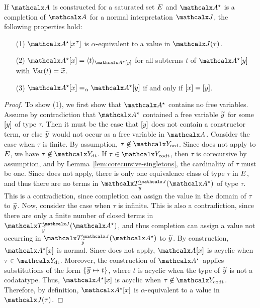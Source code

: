 \begin{lemma}
\label{lem:interpretation-completion}
If $\Val$ is constructed for a saturated set $E$
and $\ValC$ is a completion of $\Val$ for a normal interpretation $\J$, the following properties hold:
\begin{enumerate}
\item[\rm (1)] $\ValC \ec{x\typ{\tau}}$ is $\alpha$-equivalent to a value in $\interp{\J}{\tau}$.
\item[\rm (2)]
$\ValC \ec{x} = \expand{\ValC \ec{y}}{ t }$ for
all subterms $t$ of $\ValC \ec{y}$ with $\muvar(t) = {\Varec{x}}$.
\item[\rm (3)]
$\ValC \ec{x} \vsim \ValC \ec{y}$ if and only if $[x] = [y]$.
\end{enumerate}
\end{lemma}
\begin{rep}
\begin{proof}
To show (1), we first show that $\ValC$ contains no free variables.
Assume by contradiction that $\ValC$ contained a free variable ${\Varec{y}}$ for some $[y]$ of type $\tau$.
Then it must be the case that $[y]$ does not contain a constructor term,
or else ${\Varec{y}}$ would not occur as a free variable in $\Val$.
Consider the case when $\tau$ is finite.
By assumption, $\tau \not\in \Nondata$.
Since  does not apply to $E$, we have $\tau \not\in \Data$.
If $\tau \in \Codata$, then $\tau$ is corecursive by assumption, and by Lemma~\ref{lem:corecursive-singletons},
the cardinality of $\tau$ must be one.
Since  does not apply, %
there is only one equivalence class of type $\tau$ in $E$,
and thus there are no terms in $\Terms^{\smash{\J}}_{\Varec{y}}(\ValC)$ of type $\tau$.
This is a contradiction, since %
completion can assign the value in the domain of $\tau$ to ${\Varec{y}}$.
Now, consider the case when $\tau$ is infinite.
This is also a contradiction,
since there are only a finite number of closed terms in $\Terms^{\smash{\J}}_{\Varec{y}}(\ValC)$,
and thus %
completion can assign a value not occurring in $\Terms^{\smash{\J}}_{\Varec{y}}(\ValC)$ to ${\Varec{y}}$.
By construction, $\ValC \ec{x}$ is normal.
Since  does not apply, $\Val \ec{x}$ is acyclic when $\tau \in \Data$.
Moreover, the construction of $\ValC$ applies substitutions of the form
$\{ {\Varec{y}} \mapsto t \}$, where $t$ is acyclic when the type of ${\Varec{y}}$ is not a codatatype.
Thus, $\ValC \ec{x}$ is acyclic when $\tau \not\in \Codata$.
Therefore, by definition, $\ValC \ec{x}$ is $\alpha$-equivalent to a value in $\interp{\J}{\tau}$.


\end{proof}
\end{rep}

